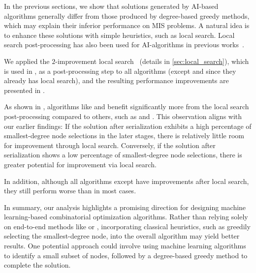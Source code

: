 In the previous sections, we show that solutions generated by AI-based algorithms generally differ from those produced by degree-based greedy methods, which may explain their inferior performance on MIS problems. A natural idea is to enhance these solutions with simple heuristics, such as local search. Local search post-processing has also been used for AI-algorithms in previous works~\citep{ahn2020learning, boether_dltreesearch_2022}. 

We applied the $2$-improvement local search~\citep{andrade2012fast} (details in \ref{sec:local_search}), which is used in \kamis, as a post-processing step to all algorithms (except \onlinemis and \redumis since they already has local search), and the resulting performance improvements are presented in .



As shown in , algorithms like \pcqo and \difusco benefit significantly more from the local search post-processing compared to others, such as \deggreedy and \lwd. This observation aligns with our earlier findings: If the solution after serialization exhibits a high percentage of smallest-degree node selections in the later stages, there is relatively little room for improvement through local search.
Conversely, if the solution after serialization shows a low percentage of smallest-degree node selections, there is greater potential for improvement via local search.

In addition, although all algorithms except \isco have improvements after local search, they still perform worse than \redumis in most cases.

In summary, our analysis highlights a promising direction for designing machine learning-based combinatorial optimization algorithms. Rather than relying solely on end-to-end methods like \pcqo or \difusco, incorporating classical heuristics, such as greedily selecting the smallest-degree node, into the overall algorithm may yield better results. One potential approach could involve using machine learning algorithms to identify a small subset of nodes, followed by a degree-based greedy method to complete the solution.

